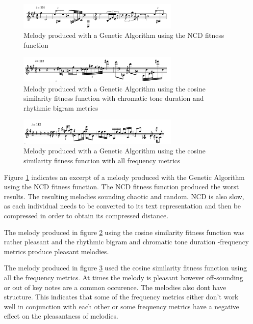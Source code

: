 \begin{figure}
\centerline{\includegraphics[width=300px]{../images/genetic_ncd.pdf}}
\caption{Melody produced with a Genetic Algorithm using the \ac{NCD} fitness function}
\label{ims:genetic_mel_ncd}
\end{figure}

\begin{figure}
\centerline{\includegraphics[width=300px]{../images/genetic_cosine_ctd_rb.pdf}}
\caption{Melody produced with a Genetic Algorithm using the cosine similarity fitness function with chromatic tone duration and rhythmic bigram metrics}
\label{ims:genetic_mel_ctdrb}
\end{figure}

\begin{figure}
\centerline{\includegraphics[width=300px]{../images/genetic_cosine_all.pdf}}
\caption{Melody produced with a Genetic Algorithm using the cosine similarity fitness function with all frequency metrics}
\label{ims:genetic_mel_mall}
\end{figure}

Figure \ref{ims:genetic_mel_ncd} indicates an excerpt of a melody produced with the Genetic Algorithm using the \ac{NCD} fitness function. The \ac{NCD} fitness function produced the worst results. The resulting melodies sounding chaotic and random. \ac{NCD} is also slow, as each individual needs to be converted to its text representation and then be compressed in order to obtain its compressed distance.

The melody produced in figure \ref{ims:genetic_mel_ctdrb} using the cosine similarity fitness function was rather pleasant and the rhythmic bigram and chromatic tone duration -frequency metrics produce pleasant melodies.

The melody produced in figure \ref{ims:genetic_mel_mall} used the cosine similarity fitness function using all the frequency metrics. At times the melody is pleasant however off-sounding or out of key notes are a common occurence. The melodies also dont have structure. This indicates that some of the frequency metrics either don't work well in conjunction with each other or some frequency metrics have a negative effect on the pleasantness of melodies. 

